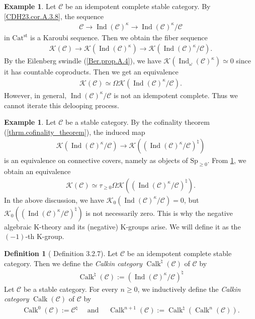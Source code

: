 \documentclass[a4paper,dvipdfmx,11pt,reqno]{amsart}
\newcommand{\C}{\mathcal{C}}
\newcommand{\K}{\mathcal{K}}
\DeclareMathOperator{\Ind}{Ind}
\DeclareMathOperator{\Calk}{Calk}
\newcommand{\Catst}{\mathrm{Cat^{st}}}
\newcommand{\Sp}{\mathrm{Sp}}
\theoremstyle{definition}
\newtheorem{definition}[theorem]{Definition}
\newtheorem{example}[theorem]{Example}
\begin{document}
\begin{example} \label{eg.KNP24.1}
  Let $\C$ be an idempotent complete stable category.
  By \cref{CDH23.cor.A.3.8}, the sequence
  \begin{align*}
    \C \to \Ind(\C)^{\kappa} \to \Ind(\C)^{\kappa}/\C
  \end{align*}
  in $\Catst$ is a Karoubi sequence.
  Then we obtain the fiber sequence
  \begin{align*}
    \K(\C) \to \K(\Ind(\C)^{\kappa}) \to \K(\Ind(\C)^{\kappa}/\C).
  \end{align*}
  By the Eilenberg swindle (\cref{Ber.prop.A.4}), we have $\K(\Ind_{\omega}(\C)^{\kappa}) \simeq 0$ since it has countable coproducts.
  Then we get an equivalence
  \begin{align*}
    \K(\C)
    \simeq \Omega\K(\Ind(\C)^{\kappa}/\C).
  \end{align*}
  However, in general, $\Ind(\C)^{\kappa}/\C$ is not an idempotent complete.
  Thus we cannot iterate this delooping process.
\end{example}  

\begin{example}
  Let $\C$ be a stable category.
  By the cofinality theorem (\cref{thrm.cofinality_theorem}), the induced map 
  \begin{align*}
    \K(\Ind(\C)^{\kappa}/\C) \to \K((\Ind(\C)^{\kappa}/\C)^{\natural})
  \end{align*}
  is an equivalence on connective covers, namely as objects of $\Sp_{\geq 0}$.
  From \cref{eg.KNP24.1}, we obtain an equivalence
  \begin{align*}
    \K(\C) 
    \simeq \tau_{\geq 0}\Omega\K((\Ind(\C)^{\kappa}/\C)^{\natural}).
  \end{align*}
  In the above discussion, we have $\K_0(\Ind(\C)^{\kappa}/\C) = 0$, but $\K_0((\Ind(\C)^{\kappa}/\C)^{\natural})$ is not necessarily zero.
  This is why the negative algebraic K-theory and its (negative) K-groups arise.
  We will define it as the $(-1)$-th K-group.
\end{example}

\begin{definition}[\cite{KNP24} Definition 3.2.7] \label{KNP24.def.3.2.7}
  Let $\C$ be an idempotent complete stable category.
  Then we define the \textit{Calkin category} $\Calk^{\natural}(\C)$ of $\C$ by
  \begin{align*}
    \Calk^{\natural}(\C) 
    := (\Ind(\C)^{\kappa}/\C)^{\natural}
  \end{align*}
  Let $\C$ be a stable category.
  For every $n \geq 0$, we inductively define the \textit{Calkin category} $\Calk(\C)$ of $\C$ by 
  \begin{align*}
    \Calk^0(\C) 
    := \C^{\natural}
    \quad \text{ and } \quad 
    \Calk^{n+1}(\C) 
    := \Calk^{\natural}(\Calk^n(\C)).
  \end{align*}
\end{definition}
\end{document}
